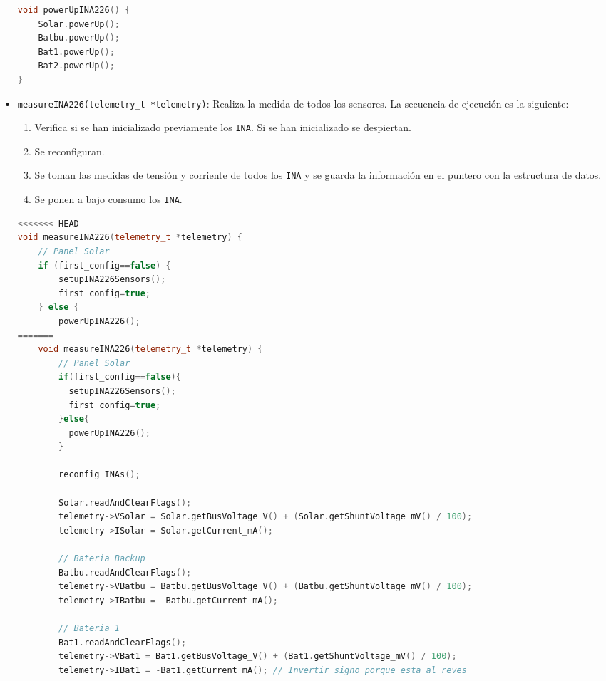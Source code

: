 \begin{itemize}
\begin{lstlisting}[captionpos=b, caption={Codigo funcion powerUpINA226}, language=c++]
void powerUpINA226() {
    Solar.powerUp();
    Batbu.powerUp();
    Bat1.powerUp();
    Bat2.powerUp();
}
\end{lstlisting}

\item \texttt{measureINA226(telemetry\_t *telemetry)}: Realiza la medida de todos los sensores. La secuencia de ejecución es la siguiente:

\begin{enumerate}
    \item Verifica si se han inicializado previamente los \texttt{INA}. Si se han inicializado se despiertan.
    \item Se reconfiguran.
    \item Se toman las medidas de tensión y corriente de todos los \texttt{INA} y se guarda la información en el puntero con la estructura de datos.
    \item Se ponen a bajo consumo los \texttt{INA}.
\end{enumerate}

\begin{lstlisting}[captionpos=b, caption={Codigo funcion measureINA226}, language=c++]
<<<<<<< HEAD
void measureINA226(telemetry_t *telemetry) {
    // Panel Solar
    if (first_config==false) {
        setupINA226Sensors();
        first_config=true;
    } else {
        powerUpINA226();  
=======
    void measureINA226(telemetry_t *telemetry) {
        // Panel Solar
        if(first_config==false){
          setupINA226Sensors();
          first_config=true;
        }else{
          powerUpINA226();
        }

        reconfig_INAs();

        Solar.readAndClearFlags();
        telemetry->VSolar = Solar.getBusVoltage_V() + (Solar.getShuntVoltage_mV() / 100);
        telemetry->ISolar = Solar.getCurrent_mA();

        // Bateria Backup
        Batbu.readAndClearFlags();
        telemetry->VBatbu = Batbu.getBusVoltage_V() + (Batbu.getShuntVoltage_mV() / 100);
        telemetry->IBatbu = -Batbu.getCurrent_mA();

        // Bateria 1
        Bat1.readAndClearFlags();
        telemetry->VBat1 = Bat1.getBusVoltage_V() + (Bat1.getShuntVoltage_mV() / 100);
        telemetry->IBat1 = -Bat1.getCurrent_mA(); // Invertir signo porque esta al reves


\end{lstlisting}
\end{itemize}
